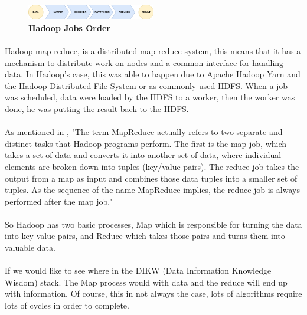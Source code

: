 \begin{figure}[h]
	\centering
	\includegraphics[width=0.5\textwidth]{images/HadoopMapReduceProcesses.png}
	\caption{\bfseries Hadoop Jobs Order}
	\label{hadoopJobsOrder}
\end{figure}

\paragraph{}Hadoop map reduce, is a distributed map-reduce system, 
this means that it has a mechanism to distribute work on nodes and a common interface for handling data. In Hadoop's case, this was able to happen due to Apache Hadoop Yarn and the Hadoop Distributed File System or as commonly used HDFS. When a job was scheduled, data were loaded by the HDFS to a worker, 
then the worker was done, he was putting the result back to the HDFS. 

\paragraph{}As mentioned in \cite{ibmMapReduce:5}, "The term MapReduce actually refers to two separate and distinct tasks that Hadoop programs perform. The first is the map job, which takes a set of data and converts it into another set of data, where individual elements are broken down into tuples (key/value pairs). The reduce job takes the output from a map as input and combines those data tuples into a smaller set of tuples. As the sequence of the name MapReduce implies, the reduce job is always performed after the map job."

\paragraph{}So Hadoop has two basic processes, Map which is responsible for turning the data into key value pairs, and Reduce which takes those pairs and turns them into valuable data.

\paragraph{}If we would like to see where in the DIKW (Data Information Knowledge Wisdom) stack. The Map process would with data and the reduce will end up with information. Of course, this in not always the case, lots of algorithms require lots of cycles in order to complete. \\
 
